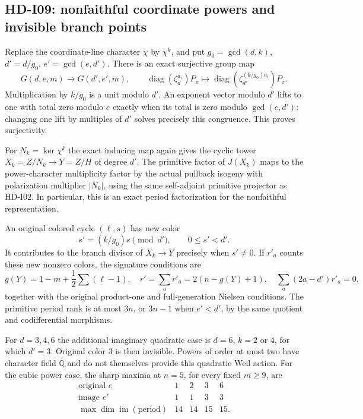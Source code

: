 \subsection{HD-I09: nonfaithful coordinate powers and invisible branch points}
\label{hd-i09}

Replace the coordinate-line character $\chi$ by $\chi^k$, and put
$g_0=\gcd(d,k)$, $d'=d/g_0$, $e'=\gcd(e,d')$. There is an exact
surjective group map
\[
 G(d,e,m)\longrightarrow G(d',e',m),\qquad
 \operatorname{diag}(\zeta_d^{a_i})P_\pi\longmapsto
 \operatorname{diag}(\zeta_{d'}^{(k/g_0)a_i})P_\pi.
\]
Multiplication by $k/g_0$ is a unit modulo $d'$. An exponent vector
modulo $d'$ lifts to one with total zero modulo $e$ exactly when its
total is zero modulo $\gcd(e,d')$: changing one lift by multiples of
$d'$ solves precisely this congruence. This proves surjectivity.

For $N_k=\ker\chi^k$ the exact inducing map again gives the cyclic
tower $X_k=Z/N_k\to Y=Z/H$ of degree $d'$. The primitive factor of
$J(X_k)$ maps to the power-character multiplicity factor by the actual
pullback isogeny with polarization multiplier $|N_k|$, using the same
self-adjoint primitive projector as HD-I02. In particular, this is an
exact period factorization for the nonfaithful representation.

An original colored cycle $(\ell,s)$ has new color
\[
 s'=(k/g_0)s\pmod{d'},\qquad 0\le s'<d'.
\]
It contributes to the branch divisor of $X_k\to Y$ precisely when
$s'\ne0$. If $r'_a$ counts these new nonzero colors, the signature
conditions are
\[
 g(Y)=1-m+\frac12\sum(\ell-1),\quad
 r'=\sum_a r'_a=2(n-g(Y)+1),\quad
 \sum_a(2a-d')r'_a=0,
\]
together with the original product-one and full-generation Nielsen
conditions. The primitive period rank is at most $3n$, or $3n-1$
when $e'<d'$, by the same quotient and codifferential morphisms.

For $d=3,4,6$ the additional imaginary quadratic case is
$d=6$, $k=2$ or $4$, for which $d'=3$. Original color $3$ is then
invisible. Powers of order at most two have character field
$\mathbb Q$ and do not themselves provide this quadratic Weil action.
For the cubic power case, the sharp maxima at $n=5$, for every fixed
$m\ge9$, are
\[
\begin{array}{c|rrrr}
 \text{original }e&1&2&3&6\\\hline
 \text{image }e'&1&1&3&3\\
 \max\dim\operatorname{im}(\mathrm{period})&14&14&15&15.
\end{array}
\]

